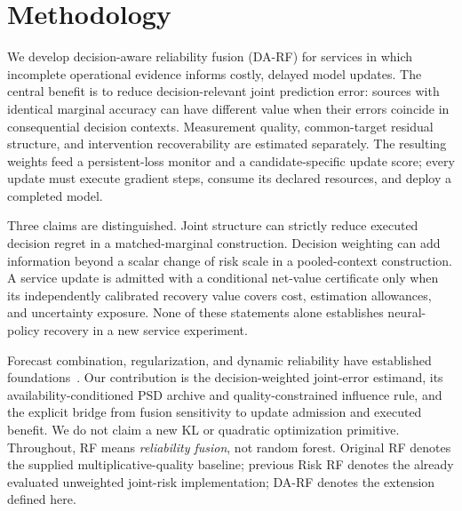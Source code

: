 \documentclass[10pt]{article}
\begin{document}
\section{Methodology}
\label{sec:methodology}

We develop decision-aware reliability fusion (DA-RF) for services in which
incomplete operational evidence informs costly, delayed model updates.
The central benefit is to reduce decision-relevant joint prediction error:
sources with identical marginal accuracy can have different value when their
errors coincide in consequential decision contexts. Measurement quality,
common-target residual structure, and intervention recoverability are estimated
separately. The resulting weights feed a persistent-loss monitor and a
candidate-specific update score; every update must execute gradient steps,
consume its declared resources, and deploy a completed model.

Three claims are distinguished. Joint structure can strictly reduce executed
decision regret in a matched-marginal construction. Decision weighting can add
information beyond a scalar change of risk scale in a pooled-context
construction. A service update is admitted with a conditional net-value
certificate only when its independently calibrated recovery value covers
cost, estimation allowances, and uncertainty exposure. None of these statements
alone establishes neural-policy recovery in a new service experiment.

Forecast combination, regularization, and dynamic reliability have established
foundations~\cite{bates1969,bregman1967,boyd2004,diebold2019,qmf2023,pdf2024,
huang2025}. Our contribution is the decision-weighted joint-error estimand,
its availability-conditioned PSD archive and quality-constrained influence rule,
and the explicit bridge
from fusion sensitivity to update admission and executed benefit. We do not
claim a new KL or quadratic optimization primitive. Throughout, RF means
\emph{reliability fusion}, not random forest. Original RF denotes the supplied
multiplicative-quality baseline; previous Risk RF denotes the already evaluated
unweighted joint-risk implementation; DA-RF denotes the extension defined here.
\end{document}
